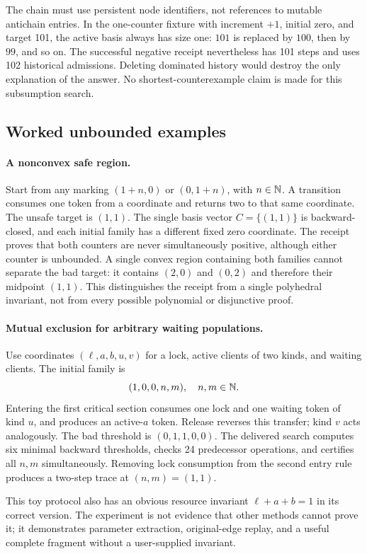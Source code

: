 The chain must use persistent node identifiers, not references to mutable
antichain entries. In the one-counter fixture with increment $+1$, initial
zero, and target 101, the active basis always has size one: $101$ is replaced
by $100$, then by $99$, and so on. The successful negative receipt nevertheless
has 101 steps and uses 102 historical admissions. Deleting dominated history
would destroy the only explanation of the answer. No shortest-counterexample
claim is made for this subsumption search.

\subsection{Worked unbounded examples}
\paragraph{A nonconvex safe region.}
Start from any marking $(1+n,0)$ or $(0,1+n)$, with $n\in\mathbb N$. A transition
consumes one token from a coordinate and returns two to that same coordinate.
The unsafe target is $(1,1)$. The single basis vector $C=\{(1,1)\}$ is
backward-closed, and each initial family has a different fixed zero coordinate.
The receipt proves that both counters are never simultaneously positive,
although either counter is unbounded. A single convex region containing both
families cannot separate the bad target: it contains $(2,0)$ and $(0,2)$ and
therefore their midpoint $(1,1)$. This distinguishes the receipt from a single
polyhedral invariant, not from every possible polynomial or disjunctive proof.

\paragraph{Mutual exclusion for arbitrary waiting populations.}
Use coordinates $(\ell,a,b,u,v)$ for a lock, active clients of two kinds, and
waiting clients. The initial family is
\[
 (1,0,0,n,m),\quad n,m\in\mathbb N.
\]
Entering the first critical section consumes one lock and one waiting token of
kind $u$, and produces an active-$a$ token. Release reverses this transfer;
kind $v$ acts analogously. The bad threshold is $(0,1,1,0,0)$. The delivered
search computes six minimal backward thresholds, checks 24 predecessor
operations, and certifies all $n,m$ simultaneously. Removing lock consumption
from the second entry rule produces a two-step trace at $(n,m)=(1,1)$.

This toy protocol also has an obvious resource invariant
$\ell+a+b=1$ in its correct version. The experiment is not evidence that other
methods cannot prove it; it demonstrates parameter extraction, original-edge
replay, and a useful complete fragment without a user-supplied invariant.
